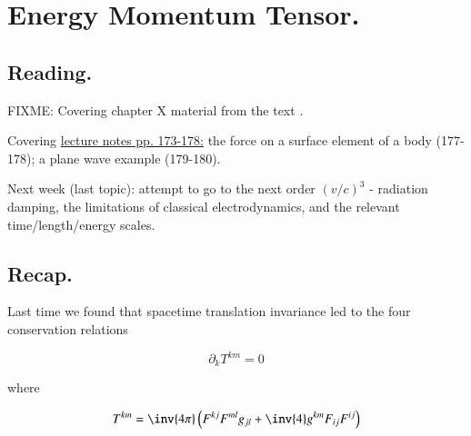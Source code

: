%
%

\chapter{Energy Momentum Tensor.}
\label{chap:relativisticElectrodynamicsL23}
{}
\date{Mar 29, 2011}

\beginArtNoToc

\section{Reading.}

FIXME:
Covering chapter X material from the text \citep{landau1980classical}.

Covering \href{http://www.physics.utoronto.ca/~poppitz/epoppitz/PHY450_files/RelEMpp166-180.pdf}{lecture notes pp. 173-178:} the force on a surface element of a body (177-178); a plane wave example (179-180).

Next week (last topic): attempt to go to the next order $(v/c)^3$ - radiation damping, the limitations of classical electrodynamics, and the relevant time/length/energy scales.

\section{Recap.}

Last time we found that spacetime translation invariance led to the four conservation relations

\begin{equation}\label{eqn:relativisticElectrodynamicsL23:10}
\partial_k T^{k m} = 0
\end{equation}

where

\begin{equation}\label{eqn:relativisticElectrodynamicsL23:30}
T^{k m} = \inv{4 \pi} \left( F^{k j} F^{m l} g_{j l} + \inv{4} g^{k m} F_{i j} F^{i j} \right)
\end{equation}

